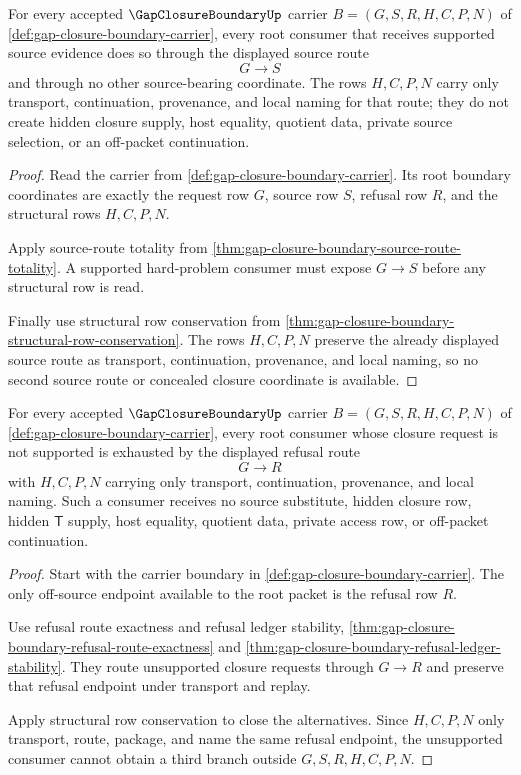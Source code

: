 \begin{theorem}
\label{thm:gap-closure-boundary-root-request-source-totality}
For every accepted $\GapClosureBoundaryUp$ carrier $B=(G,S,R,H,C,P,N)$ of \autoref{def:gap-closure-boundary-carrier}, every root consumer that receives supported source evidence does so through the displayed source route
$$
G \longrightarrow S
$$
and through no other source-bearing coordinate. The rows $H,C,P,N$ carry only transport, continuation, provenance, and local naming for that route; they do not create hidden closure supply, host equality, quotient data, private source selection, or an off-packet continuation.
\end{theorem}
\begin{proof}
Read the carrier from \autoref{def:gap-closure-boundary-carrier}. Its root boundary coordinates are exactly the request row $G$, source row $S$, refusal row $R$, and the structural rows $H,C,P,N$.

Apply source-route totality from \autoref{thm:gap-closure-boundary-source-route-totality}. A supported hard-problem consumer must expose $G \longrightarrow S$ before any structural row is read.

Finally use structural row conservation from \autoref{thm:gap-closure-boundary-structural-row-conservation}. The rows $H,C,P,N$ preserve the already displayed source route as transport, continuation, provenance, and local naming, so no second source route or concealed closure coordinate is available.
\end{proof}

\begin{theorem}
\label{thm:gap-closure-boundary-root-refusal-consumer-totality}
For every accepted $\GapClosureBoundaryUp$ carrier $B=(G,S,R,H,C,P,N)$ of \autoref{def:gap-closure-boundary-carrier}, every root consumer whose closure request is not supported is exhausted by the displayed refusal route
$$
G \longrightarrow R
$$
with $H,C,P,N$ carrying only transport, continuation, provenance, and local naming. Such a consumer receives no source substitute, hidden closure row, hidden $\mathsf{T}$ supply, host equality, quotient data, private access row, or off-packet continuation.
\end{theorem}
\begin{proof}
Start with the carrier boundary in \autoref{def:gap-closure-boundary-carrier}. The only off-source endpoint available to the root packet is the refusal row $R$.

Use refusal route exactness and refusal ledger stability, \autoref{thm:gap-closure-boundary-refusal-route-exactness} and \autoref{thm:gap-closure-boundary-refusal-ledger-stability}. They route unsupported closure requests through $G \longrightarrow R$ and preserve that refusal endpoint under transport and replay.

Apply structural row conservation to close the alternatives. Since $H,C,P,N$ only transport, route, package, and name the same refusal endpoint, the unsupported consumer cannot obtain a third branch outside $G,S,R,H,C,P,N$.
\end{proof}

